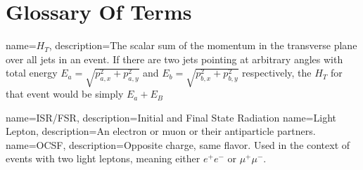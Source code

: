 \chapter*{Glossary Of Terms} \label{ch:glossary}

{
        name=$H_T$,
        description={The scalar sum of the momentum in the transverse plane over all jets in an event. If there are two jets pointing at arbitrary angles with total energy $E_a=\sqrt{p_{a,x}^2 + p_{a,y}^2}$ and $E_b=\sqrt{p_{b,x}^2 + p_{b,y}^2}$ respectively, the $H_T$ for that event would be simply $E_a + E_B$}
}

{
        name=ISR/FSR,
        description={Initial and Final State Radiation}
}
{
        name=Light Lepton,
        description={An electron or muon or their antiparticle partners.}
}
{
        name=OCSF,
        description={Opposite charge, same flavor. Used in the context of events with two light leptons, meaning either $e^+e^-$ or $\mu^+ \mu^-$.}
}

